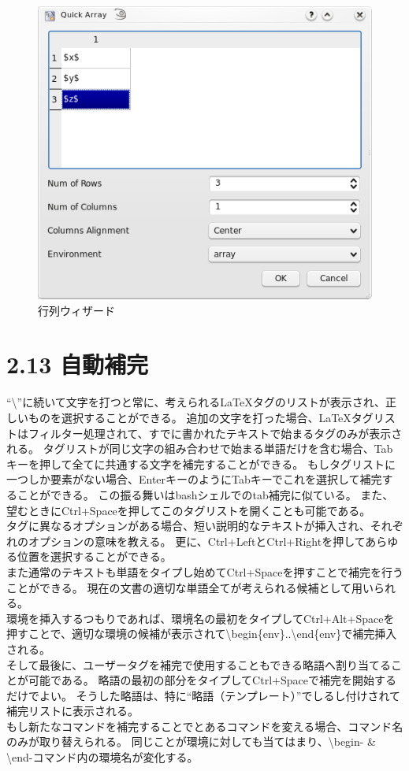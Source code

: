 \documentclass[]{book}
\makeatletter
\def\maxwidth{\ifdim\Gin@nat@width>\linewidth\linewidth
\else\Gin@nat@width\fi}
\let\Oldincludegraphics\includegraphics
\renewcommand{\includegraphics}[1]{\Oldincludegraphics[width=\maxwidth]{#1}}
\makeatother
\begin{document}
\begin{figure}[htbp]
\centering
\includegraphics{doc13.png}
\caption{行列ウィザード}
\end{figure}

\section{2.13 自動補完}

``\textbackslash{}''に続いて文字を打つと常に、考えられるLaTeXタグのリストが表示され、正しいものを選択することができる。
追加の文字を打った場合、LaTeXタグリストはフィルター処理されて、すでに書かれたテキストで始まるタグのみが表示される。
タグリストが同じ文字の組み合わせで始まる単語だけを含む場合、Tabキーを押して全てに共通する文字を補完することができる。
もしタグリストに一つしか要素がない場合、EnterキーのようにTabキーでこれを選択して補完することができる。
この振る舞いはbashシェルでのtab補完に似ている。
また、望むときにCtrl+Spaceを押してこのタグリストを開くことも可能である。\\
タグに異なるオプションがある場合、短い説明的なテキストが挿入され、それぞれのオプションの意味を教える。
更に、Ctrl+LeftとCtrl+Rightを押してあらゆる位置を選択することができる。\\
また通常のテキストも単語をタイプし始めてCtrl+Spaceを押すことで補完を行うことができる。
現在の文書の適切な単語全てが考えられる候補として用いられる。\\
環境を挿入するつもりであれば、環境名の最初をタイプしてCtrl+Alt+Spaceを押すことで、適切な環境の候補が表示されて\textbackslash{}begin\{env\}..\textbackslash{}end\{env\}で補完挿入される。\\
そして最後に、ユーザータグを補完で使用することもできる略語へ割り当てることが可能である。
略語の最初の部分をタイプしてCtrl+Spaceで補完を開始するだけでよい。
そうした略語は、特に``略語（テンプレート）''でしるし付けされて補完リストに表示される。\\
もし新たなコマンドを補完することでとあるコマンドを変える場合、コマンド名のみが取り替えられる。
同じことが環境に対しても当てはまり、\textbackslash{}begin- \&
\textbackslash{}end-コマンド内の環境名が変化する。
\end{document}
